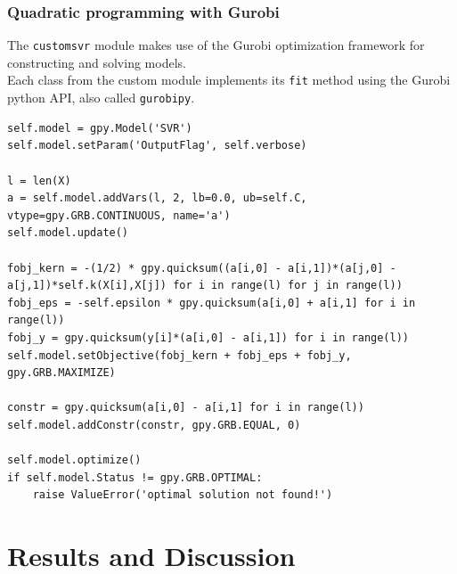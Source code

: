 \documentclass{beamer}
\newcommand*{\sectionp}{\usebeamertemplate*{section p}}
\begin{document}
\begin{frame}[fragile]
\frametitle{Quadratic programming with Gurobi}
The \texttt{customsvr} module makes use of the Gurobi optimization framework for constructing and solving models.\\
Each class from the custom module implements its \texttt{fit} method using the Gurobi python API, also called \texttt{gurobipy}.
\begin{lstlisting}
self.model = gpy.Model('SVR')
self.model.setParam('OutputFlag', self.verbose)

l = len(X)
a = self.model.addVars(l, 2, lb=0.0, ub=self.C, vtype=gpy.GRB.CONTINUOUS, name='a')
self.model.update()

fobj_kern = -(1/2) * gpy.quicksum((a[i,0] - a[i,1])*(a[j,0] - a[j,1])*self.k(X[i],X[j]) for i in range(l) for j in range(l))
fobj_eps = -self.epsilon * gpy.quicksum(a[i,0] + a[i,1] for i in range(l))
fobj_y = gpy.quicksum(y[i]*(a[i,0] - a[i,1]) for i in range(l))
self.model.setObjective(fobj_kern + fobj_eps + fobj_y, gpy.GRB.MAXIMIZE)

constr = gpy.quicksum(a[i,0] - a[i,1] for i in range(l))
self.model.addConstr(constr, gpy.GRB.EQUAL, 0)

self.model.optimize()
if self.model.Status != gpy.GRB.OPTIMAL:
	raise ValueError('optimal solution not found!')
\end{lstlisting}
\end{frame}

\section{Results and Discussion}
\frame{\sectionp}
\end{document}
